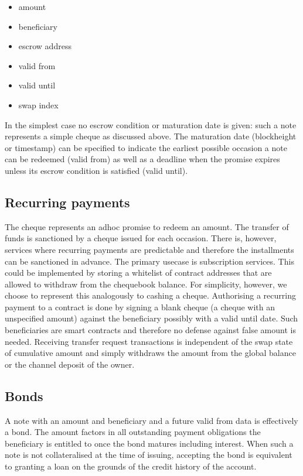 \documentclass[a4paper,10pt]{article}
\begin{document}
  \begin{itemize}
    \item amount
    \item beneficiary
    \item escrow address
    \item valid from
    \item valid until
    \item swap index
  \end{itemize}

In the simplest case no escrow condition or maturation date is given: such a note
represents a simple cheque as discussed above.
The maturation date (blockheight or timestamp) can be specified to indicate the earliest
possible occasion a note can be redeemed (valid from) as well as a deadline when the promise
expires unless its escrow condition is satisfied (valid until).

\subsection{Recurring payments}

The cheque represents an adhoc promise to redeem an amount.
The transfer of funds is sanctioned by a cheque issued for each occasion.
There is, however, services where recurring payments are predictable and therefore
the installments can be sanctioned in advance. The primary usecase is subscription
services.
This could be implemented by storing a whitelist of contract addresses that are allowed
to withdraw from the chequebook balance.
For simplicity, however, we choose to represent this analogously to cashing a cheque.
Authorising a recurring payment to a contract is done by signing a blank cheque (a cheque with
an unspecified amount) against the beneficiary possibly with a valid until date.
Such beneficiaries are smart contracts and therefore no defense against
false amount is needed.
Receiving transfer request transactions is independent of the swap state of cumulative amount
and simply withdraws the amount from the global balance or the channel deposit of the owner.

\subsection{Bonds}

A note with an amount and beneficiary and a future valid from data is effectively a bond.
The amount factors in all outstanding payment obligations the beneficiary is entitled to
once the bond matures including interest. When such a note is not collateralised at the time of issuing,
accepting the bond is equivalent to granting a loan on the grounds of the credit history of the account.
\end{document}
